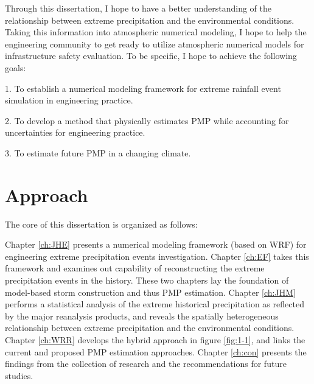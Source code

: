 Through this dissertation, I hope to have a better understanding of the relationship between extreme precipitation and the environmental conditions. Taking this information into atmospheric numerical modeling, I hope to help the engineering community to get ready to utilize atmospheric numerical models for infrastructure safety evaluation. To be specific, I hope to achieve the following goals:

1. To establish a numerical modeling framework for extreme rainfall event simulation in engineering practice.

2. To develop a method that physically estimates PMP while accounting for uncertainties for engineering practice.

3. To estimate future PMP in a changing climate.

\section {Approach}

The core of this dissertation is organized as follows:

Chapter \ref{ch:JHE} presents a numerical modeling framework (based on WRF) for engineering extreme precipitation events investigation. Chapter \ref{ch:EF} takes this framework and examines out capability of reconstructing the extreme precipitation events in the history. These two chapters lay the foundation of model-based storm construction and thus PMP estimation. Chapter \ref{ch:JHM} performs a statistical analysis of the extreme historical precipitation as reflected by the major reanalysis products, and reveals the spatially heterogeneous relationship between extreme precipitation and the environmental conditions. Chapter \ref{ch:WRR} develops the hybrid approach in figure \ref{fig:1-1}, and links the current and proposed PMP estimation approaches. Chapter \ref{ch:con} presents the findings from the collection of research and the recommendations for future studies.

